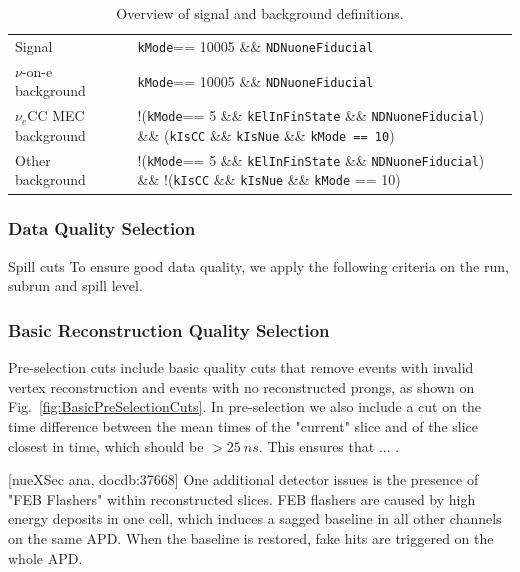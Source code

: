 \begin{table}[!ht]
\centering
\caption{Overview of signal and background definitions.}
\def\arraystretch{1.4}
\begin{tabular}{p{}p{}}
Signal                   & \texttt{kMode}== 10005 \&\& \texttt{NDNuoneFiducial}\\
$\nu$-on-e background    & \texttt{kMode}== 10005 \&\& \texttt{NDNuoneFiducial}\\
$\nu_e$CC MEC background & !(\texttt{kMode}== 5 \&\& \texttt{kElInFinState} \&\& \texttt{NDNuoneFiducial}) \&\& (\texttt{kIsCC} \&\& \texttt{kIsNue} \&\& \texttt{kMode == 10})\\
Other background         & !(\texttt{kMode}== 5 \&\& \texttt{kElInFinState} \&\& \texttt{NDNuoneFiducial}) \&\& !(\texttt{kIsCC} \&\& \texttt{kIsNue} \&\& \texttt{kMode} == 10)
\end{tabular}
\label{tab:SignalDefinitions}
\end{table}

\subsubsection*{Data Quality Selection}
Spill cuts
To ensure good data quality, we apply the following criteria on the run, subrun and spill level. 

\subsubsection*{Basic Reconstruction Quality Selection}

Pre-selection cuts include basic quality cuts that remove events with invalid vertex reconstruction and events with no reconstructed prongs, as shown on Fig.~\ref{fig:BasicPreSelectionCuts}. In pre-selection we also include a cut on the time difference between the mean times of the "current" slice and of the slice closest in time, which should be $>25\ \unit{ns}$. This ensures that ... .

[nueXSec ana, docdb:37668] One additional detector issues is the presence of "FEB Flashers" within reconstructed slices. FEB flashers are caused by high  energy deposits in one cell, which induces a sagged baseline in all other channels on the same APD. When the baseline is restored, fake hits are triggered on the whole APD.

